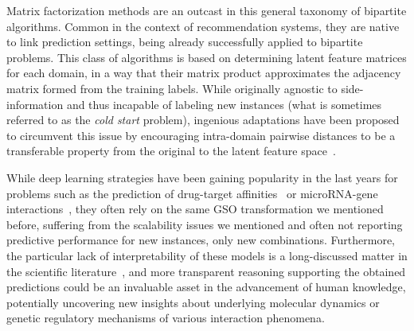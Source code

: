 Matrix factorization methods are an outcast in this general taxonomy of bipartite algorithms. Common in the context of recommendation systems, they are native to link prediction settings,
being already successfully applied to bipartite problems. This class of algorithms is based on determining latent feature matrices for each domain, in a way that their matrix product approximates the adjacency matrix formed from the training labels. While originally agnostic to side-information and thus incapable of labeling new instances (what is sometimes referred to as the \emph{cold start} problem), ingenious adaptations have been proposed~\citep{liu} to circumvent this issue by encouraging intra-domain pairwise distances to be a transferable property from the original to the latent feature space~\citep{}.

While deep learning strategies have been gaining popularity in the last years for problems such as the prediction of drug-target affinities~\citep{} or microRNA-gene interactions~\citep{}, they often rely on the same GSO transformation we mentioned before, suffering from the scalability issues we mentioned and often not reporting predictive performance for new instances, only new combinations. Furthermore, the particular lack of interpretability of these models is a long-discussed matter in the scientific literature~\citep{}, and more transparent reasoning supporting the obtained predictions could be an invaluable asset in the advancement of human knowledge, potentially uncovering new insights about underlying molecular dynamics or genetic regulatory mechanisms of various interaction phenomena.

